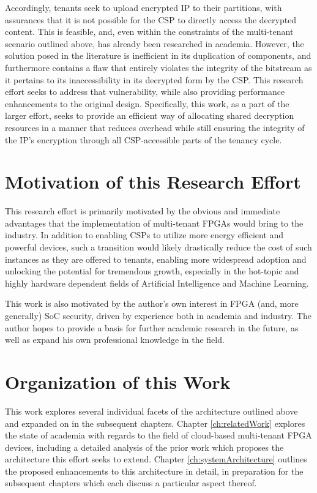 Accordingly, tenants seek to upload encrypted IP to their partitions, with assurances that it is not possible for the CSP to directly access the decrypted content. This is feasible, and, even within the constraints of the multi-tenant scenario outlined above, has already been researched in academia. However, the solution posed in the literature is inefficient in its duplication of components, and furthermore contains a flaw that entirely violates the integrity of the bitstream as it pertains to its inaccessibility in its decrypted form by the CSP. This research effort seeks to address that vulnerability, while also providing performance enhancements to the original design. Specifically, this work, as a part of the larger effort, seeks to provide an efficient way of allocating shared decryption resources in a manner that reduces overhead while still ensuring the integrity of the IP's encryption through all CSP-accessible parts of the tenancy cycle.

\section{Motivation of this Research Effort}\label{Sec:motivation}
This research effort is primarily motivated by the obvious and immediate advantages that the implementation of multi-tenant FPGAs would bring to the industry. In addition to enabling CSPs to utilize more energy efficient and powerful devices, such a transition would likely drastically reduce the cost of such instances as they are offered to tenants, enabling more widespread adoption and unlocking the potential for tremendous growth, especially in the hot-topic and highly hardware dependent fields of Artificial Intelligence and Machine Learning.

This work is also motivated by the author's own interest in FPGA (and, more generally) SoC security, driven by experience both in academia and industry. The author hopes to provide a basis for further academic research in the future, as well as expand his own professional knowledge in the field.

\section{Organization of this Work}\label{sec:organization}
This work explores several individual facets of the architecture outlined above and expanded on in the subsequent chapters. Chapter \ref{ch:relatedWork} explores the state of academia with regards to the field of cloud-based multi-tenant FPGA devices, including a detailed analysis of the prior work which proposes the architecture this effort seeks to extend. Chapter \ref{ch:systemArchitecture} outlines the proposed enhancements to this architecture in detail, in preparation for the subsequent chapters which each discuss a particular aspect thereof.


